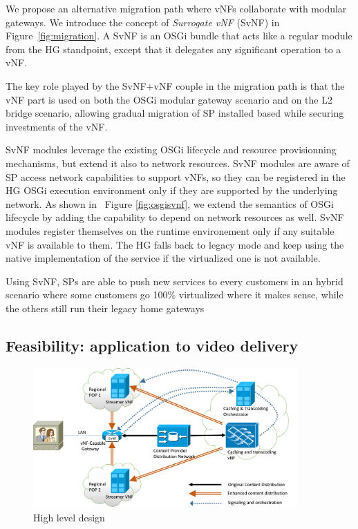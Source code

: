 We propose an alternative migration path where vNFs collaborate with modular gateways. We introduce the concept of \textit{Surrogate vNF} (SvNF) in Figure~\ref{fig:migration}. 
A SvNF is an OSGi bundle that acts like a regular module from the HG standpoint, except that it delegates any significant operation to a vNF.

The key role played by the SvNF+vNF couple in the migration path is that the vNF part is used on both the OSGi modular gateway scenario and on the L2 bridge scenario, allowing gradual migration of SP installed based while securing investments of the vNF. 

SvNF modules leverage the existing OSGi lifecycle and resource provisionning mechanisms, but extend it also to network resources. SvNF modules are aware of SP access network capabilities to support vNFs, so they can be registered in the HG OSGi execution environment only if they are supported by the underlying network.
As shown in ~Figure \ref{fig:osgisvnf}, we extend the semantics of OSGi lifecycle by adding the capability to depend on network resources as well. SvNF modules register themselves on the runtime environement only if any suitable vNF is available to them. The HG falls back to legacy mode and keep using the native implementation of the service if the virtualized one is not available.

Using SvNF, SPs are able to push new services to every customers in an hybrid scenario where some customers go 100\% virtualized where it makes sense, while the others still run their legacy home gateways

 
\subsection{Feasibility: application to video delivery}
\begin{figure}
	
	\center

	\includegraphics[width=0.90\textwidth,natwidth=8132,natheight=4335]{fig/highleveldesign.png}
	\caption{ High level design
    \label{fig:hld}
    }

\end{figure}

